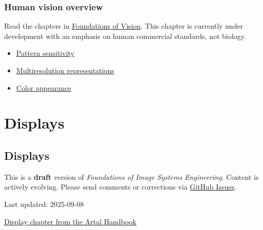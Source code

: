 \documentclass[
  letterpaper,
]{book}
\providecommand{\tightlist}{%
  \setlength{\itemsep}{0pt}\setlength{\parskip}{0pt}}\usepackage{longtable,booktabs,array}
\begin{document}
\section{Human vision overview}\label{sec-human-overview}

Read the chapters in
\href{https://foundationsofvision.stanford.edu}{Foundations of Vision}.
This chapter is currently under development with an emphasis on human
commercial standards, not biology.

\begin{itemize}
\tightlist
\item
  \href{https://wandell.github.io/FOV-1995/chapter-7-pattern-sensitivity.html}{Pattern
  sensitivity}
\item
  \href{https://wandell.github.io/FOV-1995/chapter-8-multiresolution-image-representations.html}{Multiresolution
  representations}
\item
  \href{https://wandell.github.io/FOV-1995/chapter-9-color.html}{Color
  appearance}
\end{itemize}

\part{Displays}

\chapter{Displays}\label{sec-displays}

\begin{tcolorbox}[enhanced jigsaw, opacityback=0, breakable, coltitle=black, leftrule=.75mm, left=2mm, colframe=quarto-callout-warning-color-frame, opacitybacktitle=0.6, bottomtitle=1mm, bottomrule=.15mm, toprule=.15mm, title=\textcolor{quarto-callout-warning-color}{\faExclamationTriangle}\hspace{0.5em}{Work in Progress}, titlerule=0mm, toptitle=1mm, colback=white, rightrule=.15mm, colbacktitle=quarto-callout-warning-color!10!white, arc=.35mm]

This is a \textbf{draft} version of \emph{Foundations of Image Systems
Engineering}. Content is actively evolving. Please send comments or
corrections via \href{https://github.com/wandell/FISE-git/issues}{GitHub
Issues}.

Last updated: 2025-09-08

\end{tcolorbox}

\href{resources/characterizing-artal.qmd}{Display chapter from the Artal
Handbook}
\end{document}
